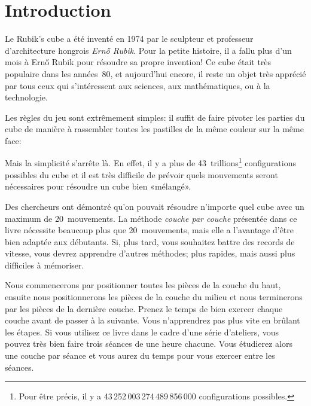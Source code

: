 \chapter{Introduction}

Le Rubik's cube a été inventé en 1974 par le sculpteur et professeur
d'architecture hongrois \emph{Ernő Rubik}. Pour la petite histoire, il a
fallu plus d'un mois à Ernő Rubik pour résoudre sa propre invention! Ce
cube était très populaire dans les années~80, et aujourd'hui encore, il
reste un objet très apprécié par tous ceux qui s'intéressent aux
sciences, aux mathématiques, ou à la technologie.

Les règles du jeu sont extrêmement simples: il suffit de faire pivoter
les parties du cube de manière à rassembler toutes les pastilles de la
même couleur sur la même face:

\begin{center}
	\RubikCubeSolved
\end{center}

Mais la simplicité s'arrête là. En effet, il y a plus de
43~trillions\footnote{Pour être précis, il y a
43\,252\,003\,274\,489\,856\,000 configurations possibles.}
configurations possibles du cube et il est très difficile de prévoir
quels mouvements seront nécessaires pour résoudre un cube bien
«mélangé».

Des chercheurs ont démontré\cite{god20} qu'on pouvait résoudre n'importe
quel cube avec un maximum de 20~mouvements. La méthode \emph{couche par
couche} présentée dans ce livre nécessite beaucoup plus que
20~mouvements, mais elle a l'avantage d'être bien adaptée aux débutants.
Si, plus tard, vous souhaitez battre des records de vitesse, vous devrez
apprendre d'autres méthodes; plus rapides, mais aussi plus difficiles à
mémoriser.
 
Nous commencerons par positionner toutes les pièces de la couche du
haut, ensuite nous positionnerons les pièces de la couche du milieu et
nous terminerons par les pièces de la dernière couche. Prenez le temps
de bien exercer chaque couche avant de passer à la suivante. Vous
n'apprendrez pas plus vite en brûlant les étapes. Si vous utilisez ce
livre dans le cadre d'une série d'ateliers, vous pouvez très bien faire
trois séances de une heure chacune. Vous étudierez alors une couche par
séance et vous aurez du temps pour vous exercer entre les séances. 

